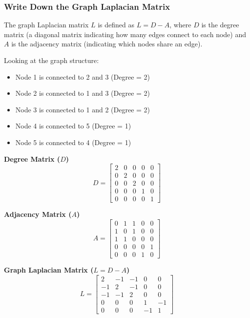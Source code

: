 \documentclass[twoside, 10pt]{article}
\begin{document}
\subsubsection{Write Down the Graph Laplacian Matrix} %
The graph Laplacian matrix $L$ is defined as $L = D - A$, where $D$ is the degree matrix (a diagonal matrix indicating how many edges connect to each node) and $A$ is the adjacency matrix (indicating which nodes share an edge).

Looking at the graph structure:
\begin{itemize}
    \item Node 1 is connected to 2 and 3 (Degree = 2)
    \item Node 2 is connected to 1 and 3 (Degree = 2)
    \item Node 3 is connected to 1 and 2 (Degree = 2)
    \item Node 4 is connected to 5 (Degree = 1)
    \item Node 5 is connected to 4 (Degree = 1)
\end{itemize}

\textbf{Degree Matrix ($D$)}
\begin{equation*}
D = \begin{bmatrix} 
2 & 0 & 0 & 0 & 0 \\ 
0 & 2 & 0 & 0 & 0 \\ 
0 & 0 & 2 & 0 & 0 \\ 
0 & 0 & 0 & 1 & 0 \\ 
0 & 0 & 0 & 0 & 1 
\end{bmatrix}
\end{equation*}

\textbf{Adjacency Matrix ($A$)}
\begin{equation*}
A = \begin{bmatrix} 
0 & 1 & 1 & 0 & 0 \\ 
1 & 0 & 1 & 0 & 0 \\ 
1 & 1 & 0 & 0 & 0 \\ 
0 & 0 & 0 & 0 & 1 \\ 
0 & 0 & 0 & 1 & 0 
\end{bmatrix}
\end{equation*}

\textbf{Graph Laplacian Matrix ($L = D - A$)}
\begin{equation*}
L = \begin{bmatrix} 
 2 & -1 & -1 &  0 &  0 \\ 
-1 &  2 & -1 &  0 &  0 \\ 
-1 & -1 &  2 &  0 &  0 \\ 
 0 &  0 &  0 &  1 & -1 \\ 
 0 &  0 &  0 & -1 &  1 
\end{bmatrix}
\end{equation*}
\end{document}

